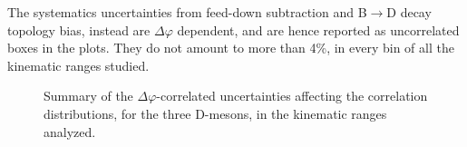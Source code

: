 The systematics uncertainties from feed-down subtraction and B$\rightarrow$D decay topology bias, instead are $\Delta\varphi$ dependent, and are hence reported as uncorrelated boxes in the plots.  They do not amount to more than 4\%, in every bin of all the kinematic ranges studied.

\begin{figure}[h]
\centering
{}
\caption{Summary of the $\Delta\varphi$-correlated uncertainties affecting the correlation distributions, for the three D-mesons, in the kinematic ranges analyzed.}
\label{fig:SystOverall}
\end{figure} 